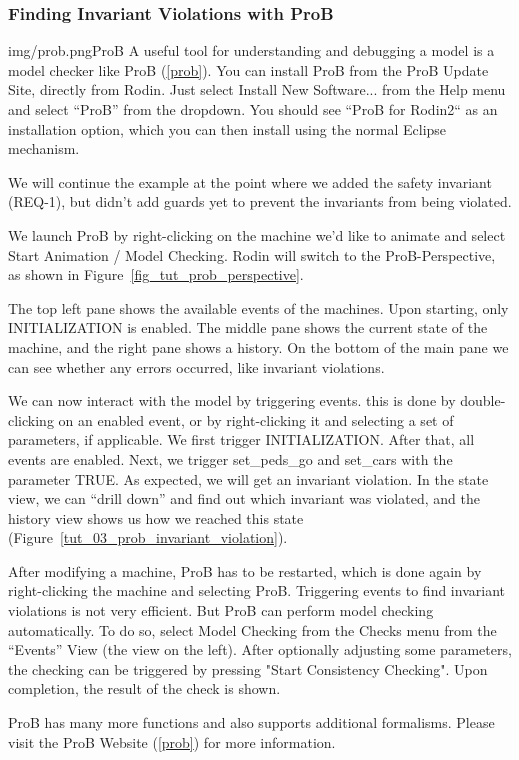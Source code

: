 \subsubsection{Finding Invariant Violations with ProB}
\label{tut:prob}
\begin{rodin-plugin}{img/prob.png}{ProB}
A useful tool for understanding and debugging a model is a model checker like ProB (\ref{prob}).  You can install ProB from the ProB Update Site, directly from Rodin.  Just select \textsf{Install New Software...} from the \textsf{Help} menu and select ``ProB'' from the dropdown. You should see ``ProB for Rodin2`` as an installation option, which you can then install using the normal Eclipse mechanism.

We will continue the example at the point where we added the safety invariant (REQ-1), but didn't add guards yet to prevent the invariants from being violated.

We launch ProB by right-clicking on the machine we'd like to animate and select \textsf{Start Animation / Model Checking}.  Rodin will switch to the ProB-Perspective, as shown in Figure~\ref{fig_tut_prob_perspective}.

The top left pane shows the available events of the machines.  Upon starting, only INITIALIZATION is enabled.  The middle pane shows the current state of the machine, and the right pane shows a history.  On the bottom of the main pane we can see whether any errors occurred, like invariant violations.

We can now interact with the model by triggering events.  this is done by double-clicking on an enabled event, or by right-clicking it and selecting a set of parameters, if applicable.  We first trigger INITIALIZATION.  After that, all events are enabled.  Next, we trigger set\_peds\_go and set\_cars with the parameter TRUE.  As expected, we will get an invariant violation.  In the state view, we can ``drill down'' and find out which invariant was violated, and the history view shows us how we reached this state (Figure~\ref{tut_03_prob_invariant_violation}).

After modifying a machine, ProB has to be restarted, which is done again by right-clicking the machine and selecting ProB.  Triggering events to find invariant violations is not very efficient.  But ProB can perform model checking automatically.  To do so, select \textsf{Model Checking} from the \textsf{Checks} menu from the ``Events'' View (the view on the left).  After optionally adjusting some parameters, the checking can be triggered by pressing "Start Consistency Checking".  Upon completion, the result of the check is shown.

ProB has many more functions and also supports additional formalisms.  Please visit the ProB Website (\ref{prob}) for more information.

\end{rodin-plugin}

